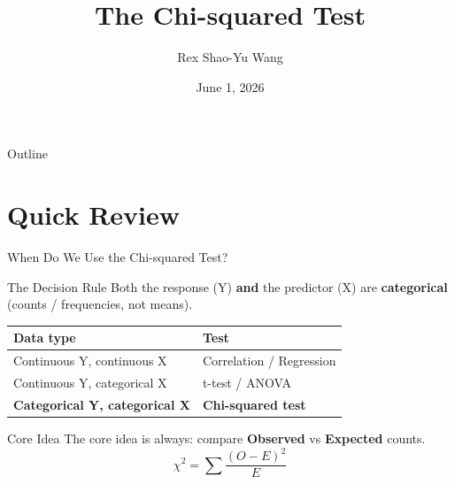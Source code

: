 \documentclass{beamer}					%
\title{The Chi-squared Test}	%
\author{Rex Shao-Yu Wang}								%
\institute{Department of Agronomy, National Taiwan University}					%
\date{June 1, 2026}									%
\begin{document}
\begin{frame}
  \titlepage
\end{frame}

\begin{frame}{Outline}
  \tableofcontents
\end{frame}

\section{Quick Review}

\begin{frame}{When Do We Use the Chi-squared Test?}

\small
\begin{block}{The Decision Rule}
Both the response (Y) \textbf{and} the predictor (X) are \textbf{categorical}
(counts / frequencies, not means).
\end{block}

\vspace{0.6em}
\begin{center}
\begin{tabular}{ll}
\toprule
\textbf{Data type} & \textbf{Test} \\
\midrule
Continuous Y, continuous X & Correlation / Regression \\
Continuous Y, categorical X & t-test / ANOVA \\
\textbf{Categorical Y, categorical X} & \textbf{Chi-squared test} \\
\bottomrule
\end{tabular}
\end{center}

\vspace{0.8em}
\begin{alertblock}{Core Idea}
The core idea is always: compare \textbf{Observed} vs \textbf{Expected} counts.
$$\chi^2 = \sum \frac{(O - E)^2}{E}$$
\end{alertblock}

\end{frame}
\end{document}
